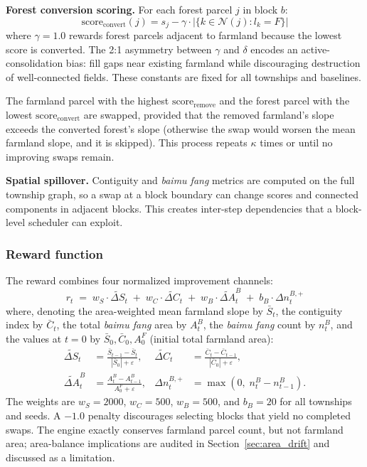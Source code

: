 \documentclass[preprint,12pt]{elsarticle}
\begin{document}
\textbf{Forest conversion scoring.} For each forest parcel $j$ in block $b$:
\begin{equation}
\text{score}_{\text{convert}}(j) = s_j - \gamma \cdot |\{k \in \mathcal{N}(j) : l_k = F\}|
\label{eq:score_convert}
\end{equation}
where $\gamma=1.0$ rewards forest parcels adjacent to farmland because the lowest score is converted. The 2:1 asymmetry between $\gamma$ and $\delta$ encodes an active-consolidation bias: fill gaps near existing farmland while discouraging destruction of well-connected fields. These constants are fixed for all townships and baselines.

The farmland parcel with the highest $\text{score}_{\text{remove}}$ and the forest parcel with the lowest $\text{score}_{\text{convert}}$ are swapped, provided that the removed farmland's slope exceeds the converted forest's slope (otherwise the swap would worsen the mean farmland slope, and it is skipped). This process repeats $\kappa$ times or until no improving swaps remain.

\textbf{Spatial spillover.} Contiguity and \textit{baimu fang} metrics are computed on the full township graph, so a swap at a block boundary can change scores and connected components in adjacent blocks. This creates inter-step dependencies that a block-level scheduler can exploit.

\subsubsection{Reward function}

The reward combines four normalized improvement channels:
\begin{equation}
r_t \;=\; w_S \cdot \widetilde{\Delta S}_t \;+\; w_C \cdot \widetilde{\Delta C}_t \;+\; w_B \cdot \widetilde{\Delta A}^{B}_t \;+\; b_B \cdot \Delta n^{B,+}_t
\label{eq:reward}
\end{equation}
where, denoting the area-weighted mean farmland slope by $\bar{S}_t$, the contiguity index by $\bar{C}_t$, the total \textit{baimu fang} area by $A^{B}_t$, the \textit{baimu fang} count by $n^{B}_t$, and the values at $t{=}0$ by $\bar{S}_0,\bar{C}_0,A^{F}_0$ (initial total farmland area):
\begin{align}
\widetilde{\Delta S}_t &= \frac{\bar{S}_{t-1} - \bar{S}_t}{|\bar{S}_0| + \varepsilon}, &
\widetilde{\Delta C}_t &= \frac{\bar{C}_t - \bar{C}_{t-1}}{|\bar{C}_0| + \varepsilon}, \\
\widetilde{\Delta A}^{B}_t &= \frac{A^{B}_t - A^{B}_{t-1}}{A^{F}_0 + \varepsilon}, &
\Delta n^{B,+}_t &= \max\!\left(0,\; n^{B}_t - n^{B}_{t-1}\right).
\end{align}
The weights are $w_S=2000$, $w_C=500$, $w_B=500$, and $b_B=20$ for all townships and seeds. A $-1.0$ penalty discourages selecting blocks that yield no completed swaps. The engine exactly conserves farmland parcel count, but not farmland area; area-balance implications are audited in Section~\ref{sec:area_drift} and discussed as a limitation.
\end{document}
